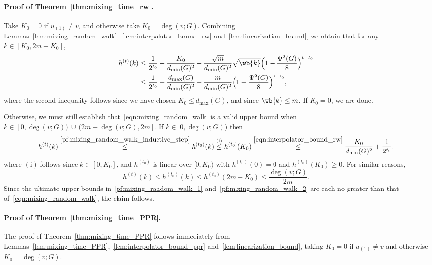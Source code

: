\paragraph{Proof of Theorem~\ref{thm:mixing_time_rw}.}
	Take $K_0 = 0$ if $u_{(1)} \neq v$, and otherwise take $K_0 = \deg(v;G)$. Combining Lemmas~\ref{lem:mixing_random_walk},~\ref{lem:interpolator_bound_rw} and~\ref{lem:linearization_bound}, we obtain that for any $k \in [K_0,2m - K_0]$, 
	\begin{align*}
	h^{(t)}(k) & \leq \frac{1}{2^{t_0}} + \frac{K_0}{d_{\min}(G)^2}  + \frac{\sqrt{m}}{d_{\min}(G)^2} \sqrt{\wb{k}} \Bigl(1 - \frac{\Psi^2(G)}{8}\Bigr)^{t-t_0} \\
	& \leq \frac{1}{2^{t_0}} + \frac{d_{\max}(G)}{d_{\min}(G)^2}  + \frac{m}{d_{\min}(G)^2} \Bigl(1 - \frac{\Psi^2(G)}{8}\Bigr)^{t-t_0},
	\end{align*}
	where the second inequality follows since we have chosen $K_0 \leq d_{\max}(G)$, and since $\wb{k} \leq m$. If $K_0 = 0$, we are done. 
	
	Otherwise, we must still establish that~\eqref{eqn:mixing_random_walk} is a valid upper bound when $k \in [0, \deg(v;G)) ~\cup~ (2m - \deg(v;G),2m]$. If $k \in [0, \deg(v;G))$ then
	\begin{equation}
	\label{pf:mixing_random_walk_1}
	h^{(t)}(k) \overset{\eqref{pf:mixing_random_walk_inductive_step}}{\leq} h^{(t_0)}(k) \overset{(\textrm{i})}{\leq} h^{(t_0)}(K_0) \overset{\eqref{eqn:interpolator_bound_rw}}{\leq} \frac{K_0}{d_{\min}(G)^2} + \frac{1}{2^{t_0}},
	\end{equation}
	where $(\textrm{i})$ follows since $k \in [0,K_0]$, and $h^{(t_0)}$ is linear over $[0,K_0)$ with $h^{(t_0)}(0) = 0$ and $h^{(t_0)}(K_0) \geq 0$. For similar reasons,
	\begin{equation}
	\label{pf:mixing_random_walk_2}
	h^{(t)}(k) \leq h^{(t_0)}(k) \leq h^{(t_0)}(2m - K_0) \leq \frac{\deg(v;G)}{2m}.
	\end{equation}
	Since the ultimate upper bounds in~\eqref{pf:mixing_random_walk_1} and~\eqref{pf:mixing_random_walk_2} are each no greater than that of~\eqref{eqn:mixing_random_walk}, the claim follows.

\paragraph{Proof of Theorem~\ref{thm:mixing_time_PPR}.}
	The proof of Theorem~\ref{thm:mixing_time_PPR} follows immediately from Lemmas~\ref{lem:mixing_time_PPR},~\ref{lem:interpolator_bound_ppr} and~\ref{lem:linearization_bound}, taking $K_0 = 0$ if $u_{(1)} \neq v$ and otherwise $K_0 = \deg(v;G)$. 

